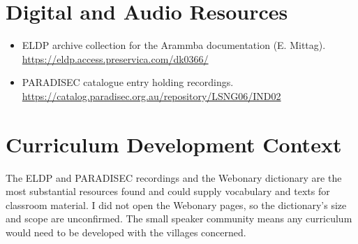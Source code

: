 \documentclass[12pt]{article}
\begin{document}
\section{Digital and Audio Resources}
\begin{itemize}
\item ELDP archive collection for the Arammba documentation (E. Mittag). \url{https://eldp.access.preservica.com/dk0366/}
\item PARADISEC catalogue entry holding recordings. \url{https://catalog.paradisec.org.au/repository/LSNG06/IND02}
\end{itemize}

\section{Curriculum Development Context}
The ELDP and PARADISEC recordings and the Webonary dictionary are the most substantial resources found and could supply vocabulary and texts for classroom material. I did not open the Webonary pages, so the dictionary's size and scope are unconfirmed. The small speaker community means any curriculum would need to be developed with the villages concerned.
\end{document}
